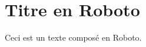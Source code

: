 \documentclass{scrartcl}
\begin{document}
\section{Titre en Roboto}
Ceci est un texte composé en Roboto.
\end{document}
